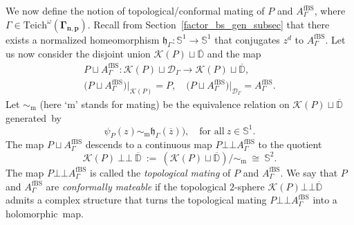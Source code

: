 \documentclass[10pt,a4paper]{amsart}
\theoremstyle{definition}
\theoremstyle{remark}
\newcommand{\D}{\mathbb{D}}
\newcommand{\mate}{\bot \!\! \! {\bot}}
\begin{document}
We now define the notion of topological/conformal mating of $P$ and $A_{\Gamma}^{\mathrm{fBS}}$, where $\Gamma\in\mathrm{Teich}^\omega(\pmb{\Gamma_{n,p}})$.
Recall from Section~\ref{factor_bs_gen_subsec} that there exists a normalized homeomorphism $\mathfrak{h}_\Gamma:\mathbb{S}^1\to\mathbb{S}^1$ that conjugates $z^d$ to $A_{\Gamma}^{\mathrm{fBS}}$.
Let us now consider the disjoint union $\mathcal{K}(P)\sqcup \overline{\D}$ and the map\vspace*{-3pt}
\begin{gather*}
P\sqcup A_{\Gamma}^{\mathrm{fBS}}: \mathcal{K}(P)\sqcup \mathcal{D}_{\Gamma}\to \mathcal{K}(P)\sqcup \overline{\D},\\
\bigl(P\sqcup A_{\Gamma}^{\mathrm{fBS}}\bigr)\vert_{\mathcal{K}(P)}=P,\quad \bigl(P\sqcup A_{\Gamma}^{\mathrm{fBS}}\bigr)\vert_{\mathcal{D}_{\Gamma}}=A_{\Gamma}^{\mathrm{fBS}}.
\end{gather*}
Let $\sim_{\mathrm{m}}$ (here `m' stands for mating) be the equivalence relation on $\mathcal{K}(P)\sqcup \overline{\D}$ generated~by\vspace*{-3pt}
\begin{equation}
\psi_{P}(z)\sim_{\mathrm{m}} \mathfrak{h}_\Gamma(\overline{z})),\quad \text{for all}\ z\in\mathbb{S}^1.
\label{conf_mat_equiv_rel}
\end{equation}
The map $P\sqcup A_{\Gamma}^{\mathrm{fBS}}$ descends to a continuous map $P\mate A_{\Gamma}^{\mathrm{fBS}}$ to the quotient\vspace*{-3pt}
\[
\mathcal{K}(P)\ \mate\ \overline{\D}\ :=\ \left(\mathcal{K}(P)\sqcup \overline{\D}\right)/\sim_{\mathrm{m}}\ \cong\ \mathbb{S}^2.
\]
The map $P\mate A_{\Gamma}^{\mathrm{fBS}}$ is called the \emph{topological mating} of $P$ and $A_{\Gamma}^{\mathrm{fBS}}$.
We say that $P$ and $A_{\Gamma}^{\mathrm{fBS}}$ are \emph{conformally mateable} if the topological $2$-sphere $\mathcal{K}(P)\mate \overline{\D}$ admits a complex structure that turns the topological mating $P\mate A_{\Gamma}^{\mathrm{fBS}}$ into a holomorphic~map.
\end{document}
